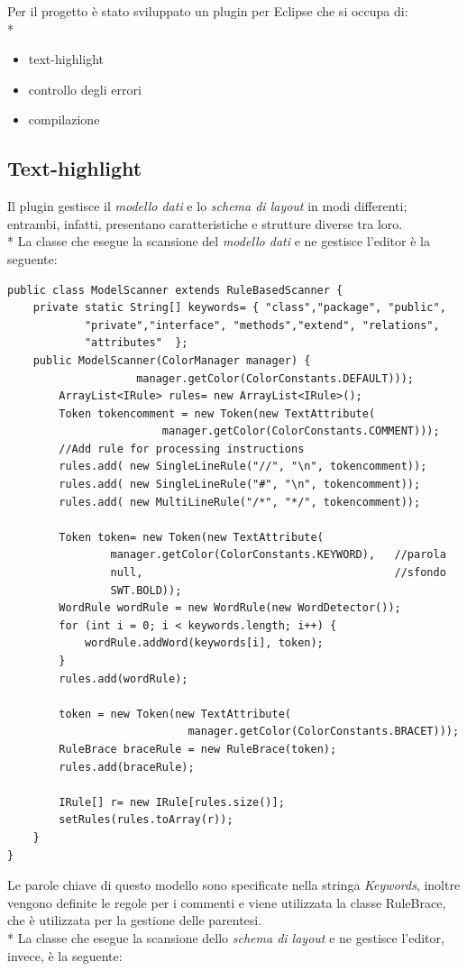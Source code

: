 Per il progetto è stato sviluppato un plugin per Eclipse che si occupa di: \\*
\begin{itemize}
  \item text-highlight
  \item controllo degli errori
  \item compilazione
\end{itemize} 


\subsection{Text-highlight}
Il plugin gestisce il \emph{modello dati} e lo \emph{schema di layout} in modi differenti; 
entrambi, infatti, presentano caratteristiche e strutture diverse tra loro. \\*
La classe che esegue la scansione del \emph{modello dati} e ne gestisce l'editor
è la seguente:

\begin{lstlisting}[caption={ModelScanner}, style={java}]
public class ModelScanner extends RuleBasedScanner {
	private static String[] keywords= { "class","package", "public",
			"private","interface", "methods","extend", "relations", 
			"attributes"  };
	public ModelScanner(ColorManager manager) {
					manager.getColor(ColorConstants.DEFAULT)));
		ArrayList<IRule> rules= new ArrayList<IRule>();	
		Token tokencomment = new Token(new TextAttribute(
						manager.getColor(ColorConstants.COMMENT)));
		//Add rule for processing instructions
		rules.add( new SingleLineRule("//", "\n", tokencomment));
		rules.add( new SingleLineRule("#", "\n", tokencomment));
		rules.add( new MultiLineRule("/*", "*/", tokencomment));
		
		Token token= new Token(new TextAttribute(
				manager.getColor(ColorConstants.KEYWORD), 	//parola
				null,                                       //sfondo
				SWT.BOLD));
		WordRule wordRule = new WordRule(new WordDetector());
		for (int i = 0; i < keywords.length; i++) {
			wordRule.addWord(keywords[i], token);
		}		
		rules.add(wordRule);
		
		token = new Token(new TextAttribute(
							manager.getColor(ColorConstants.BRACET)));
		RuleBrace braceRule = new RuleBrace(token);
		rules.add(braceRule);
		
		IRule[] r= new IRule[rules.size()];
		setRules(rules.toArray(r));
	}
}
\end{lstlisting}


Le parole chiave di questo modello sono specificate nella stringa
\emph{Keywords}, inoltre vengono definite le regole per i commenti e viene
utilizzata la classe RuleBrace, che è utilizzata per la gestione delle
parentesi.\\* 
La classe che esegue la scansione dello  \emph{schema di layout} e ne gestisce
l'editor, invece, è la seguente:

